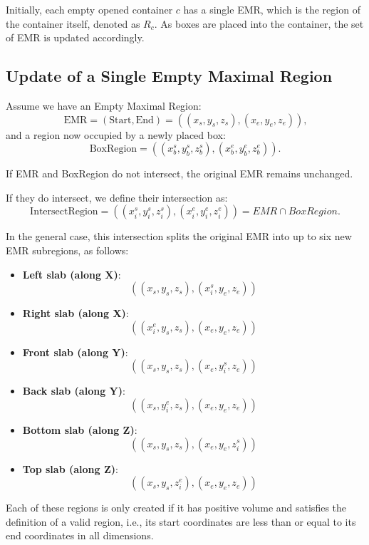 Initially, each empty opened container $c$ has a single EMR, which is the region of the container itself, denoted as $R_c$. As boxes are placed into the container, the set of EMR is updated accordingly.

\subsection{Update of a Single Empty Maximal Region}

Assume we have an Empty Maximal Region:
\[
\text{EMR} = (\text{Start}, \text{End}) = ((x_s, y_s, z_s), (x_e, y_e, z_e))\text{,}
\]
and a region now occupied by a newly placed box:
\[
\text{BoxRegion} = ((x_b^s, y_b^s, z_b^s), (x_b^e, y_b^e, z_b^e))\text{.}
\]

If EMR and BoxRegion do not intersect, the original EMR remains unchanged.

If they do intersect, we define their intersection as:
\[
\text{IntersectRegion} = ((x_i^s, y_i^s, z_i^s), (x_i^e, y_i^e, z_i^e)) = \textit{EMR} \cap \textit{BoxRegion}\text{.}
\]

In the general case, this intersection splits the original EMR into up to six new EMR subregions, as follows:

\begin{itemize}
    \item \textbf{Left slab (along X)}:
    \[
    ((x_s, y_s, z_s), (x_i^s, y_e, z_e)) 
    \]

    \item \textbf{Right slab (along X)}:
    \[
    ((x_i^e, y_s, z_s), (x_e, y_e, z_e)) 
    \]

    \item \textbf{Front slab (along Y)}:
    \[
    ((x_s, y_s, z_s), (x_e, y_i^s, z_e)) 
    \]

    \item \textbf{Back slab (along Y)}:
    \[
    ((x_s, y_i^e, z_s), (x_e, y_e, z_e))
    \]

    \item \textbf{Bottom slab (along Z)}:
    \[
    ((x_s, y_s, z_s), (x_e, y_e, z_i^s))
    \]

    \item \textbf{Top slab (along Z)}:
    \[
    ((x_s, y_s, z_i^e), (x_e, y_e, z_e))
    \]
\end{itemize}

Each of these regions is only created if it has positive volume and satisfies the definition of a valid region, i.e., its start coordinates are less than or equal to its end coordinates in all dimensions.


